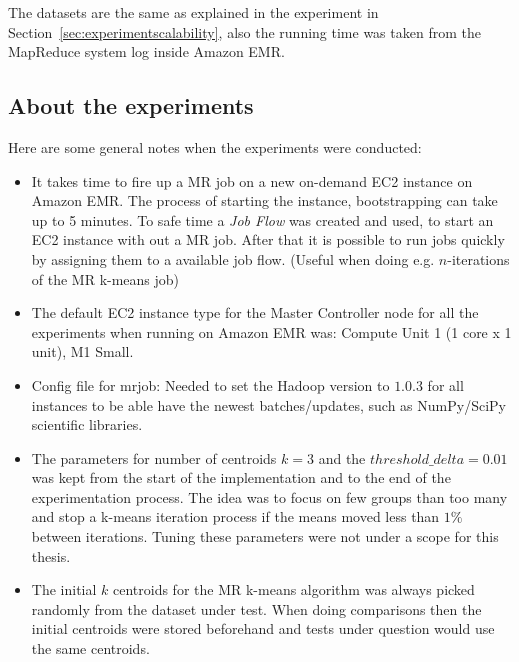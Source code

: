 The datasets are the same as explained in the experiment in Section~\ref{sec:experimentscalability}, also the running time was taken from the MapReduce system log inside Amazon EMR.

\subsection{About the experiments}
Here are some general notes when the experiments were conducted:

\begin{itemize}
\item It takes time to fire up a MR job on a new on-demand EC2 instance on Amazon EMR. The process of starting the instance, bootstrapping can take up to 5 minutes. To safe time a \textit{Job Flow} was created and used, to start an EC2 instance with out a MR job. After that it is possible to run jobs quickly by assigning them to a available job flow. (Useful when doing e.g. $n$-iterations of the MR k-means job)
\item The default EC2 instance type for the Master Controller node for all the experiments when running on Amazon EMR was: Compute Unit 1 (1 core x 1 unit), M1 Small.
\item Config file for mrjob: Needed to set the Hadoop version to $1.0.3$ for all instances to be able have the newest batches/updates, such as NumPy/SciPy scientific libraries.
\item The parameters for number of centroids $k=3$ and the $threshold\_delta = 0.01$ was kept from the start of the implementation and to the end of the experimentation process. The idea was to focus on few groups than too many and stop a k-means iteration process if the means moved less than $1\%$ between iterations. Tuning these parameters were not under a scope for this thesis.
\item The initial $k$ centroids for the MR k-means algorithm was always picked randomly from the dataset under test. When doing comparisons then the initial centroids were stored beforehand and tests under question would use the same centroids.
\end{itemize}























